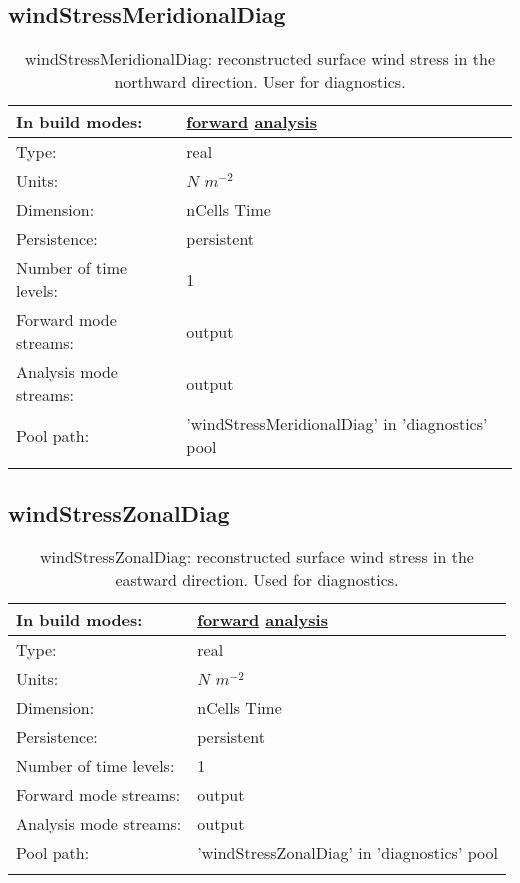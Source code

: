 \subsection[windStressMeridionalDiag]{windStressMeridionalDiag}
\label{subsec:var_sec_diagnostics_windStressMeridionalDiag}
\begin{center}
\begin{longtable}{| p{2.0in} | p{4.0in} |}
        \hline 
        In build modes: & \hyperref[subsec:forward_var_tab_diagnostics]{forward} \hyperref[subsec:analysis_var_tab_diagnostics]{analysis} \\
        \hline 
        Type: & real \\
        \hline 
        Units: & $N$ $m^{-2}$ \\
        \hline 
        Dimension: & nCells Time \\
        \hline 
        Persistence: & persistent \\
        \hline 
        Number of time levels: & 1 \\
        \hline 
		 Forward mode streams: &  output \\
        \hline 
		 Analysis mode streams: &  output \\
        \hline 
            Pool path: & 'windStressMeridionalDiag' in 'diagnostics' pool
 \\
		 \hline 
    \caption{windStressMeridionalDiag: reconstructed surface wind stress in the northward direction. User for diagnostics.}
\end{longtable}
\end{center}
\subsection[windStressZonalDiag]{windStressZonalDiag}
\label{subsec:var_sec_diagnostics_windStressZonalDiag}
\begin{center}
\begin{longtable}{| p{2.0in} | p{4.0in} |}
        \hline 
        In build modes: & \hyperref[subsec:forward_var_tab_diagnostics]{forward} \hyperref[subsec:analysis_var_tab_diagnostics]{analysis} \\
        \hline 
        Type: & real \\
        \hline 
        Units: & $N$ $m^{-2}$ \\
        \hline 
        Dimension: & nCells Time \\
        \hline 
        Persistence: & persistent \\
        \hline 
        Number of time levels: & 1 \\
        \hline 
		 Forward mode streams: &  output \\
        \hline 
		 Analysis mode streams: &  output \\
        \hline 
            Pool path: & 'windStressZonalDiag' in 'diagnostics' pool
 \\
		 \hline 
    \caption{windStressZonalDiag: reconstructed surface wind stress in the eastward direction. Used for diagnostics.}
\end{longtable}
\end{center}

